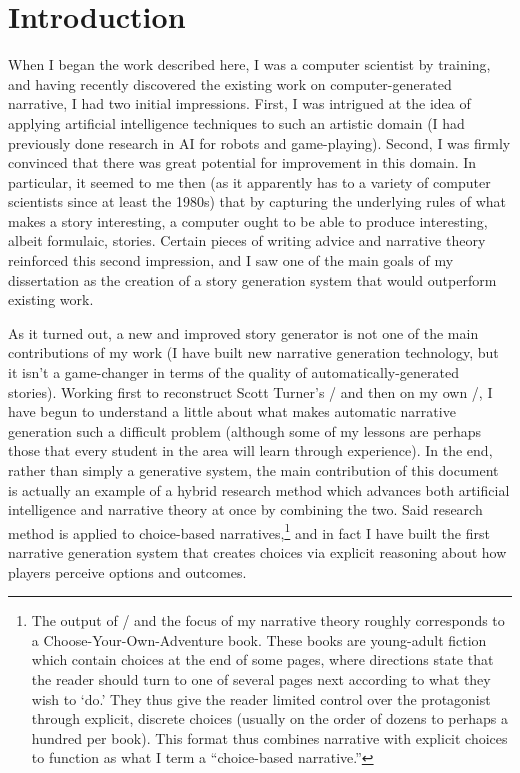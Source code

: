 \chapter{Introduction}

\label{ch:intro}

When I began the work described here, I was a computer scientist by training, and having recently discovered the existing work on computer-generated narrative, I had two initial impressions.
%
First, I was intrigued at the idea of applying artificial intelligence techniques to such an artistic domain (I had previously done research in AI for robots and game-playing).
%
Second, I was firmly convinced that there was great potential for improvement in this domain.
%
In particular, it seemed to me then (as it apparently has to a variety of computer scientists since at least the 1980s) that by capturing the underlying rules of what makes a story interesting, a computer ought to be able to produce interesting, albeit formulaic, stories.
%
Certain pieces of writing advice and narrative theory reinforced this second impression, and I saw one of the main goals of my dissertation as the creation of a story generation system that would outperform existing work.


As it turned out, a new and improved story generator is not one of the main contributions of my work (I have built new narrative generation technology, but it isn't a game-changer in terms of the quality of automatically-generated stories).
%
Working first to reconstruct Scott Turner's \minstrel/ \citep{Turner1993} and then on my own \dunyazad/, I have begun to understand a little about what makes automatic narrative generation such a difficult problem (although some of my lessons are perhaps those that every student in the area will learn through experience).
%
In the end, rather than simply a generative system, the main contribution of this document is actually an example of a hybrid research method which advances both artificial intelligence and narrative theory at once by combining the two.
%
Said research method is applied to choice-based narratives,\footnote{
The output of \dunyazad/ and the focus of my narrative theory roughly corresponds to a Choose-Your-Own-Adventure book.
%
These books are young-adult fiction which contain choices at the end of some pages, where directions state that the reader should turn to one of several pages next according to what they wish to `do.'
%
They thus give the reader limited control over the protagonist through explicit, discrete choices (usually on the order of dozens to perhaps a hundred per book).
%
This format thus combines narrative with explicit choices to function as what I term a ``choice-based narrative.''}
%
and in fact I have built the first narrative generation system that creates choices via explicit reasoning about how players perceive options and outcomes.


